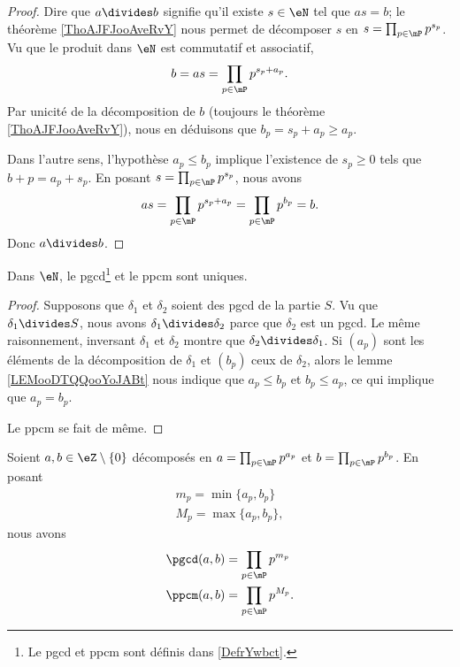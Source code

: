 \begin{proof}
    Dire que \( a\divides b\) signifie qu'il existe \( s\in \eN\) tel que \( as=b\); le théorème \ref{ThoAJFJooAveRvY} nous permet de décomposer \( s\) en \( s=\prod_{p\in\mP}p^{s_p}\). Vu que le produit dans \( \eN\) est commutatif et associatif,
    \begin{equation}
        b=as=\prod_{p\in\mP}p^{s_p+a_p}.
    \end{equation}
    Par unicité de la décomposition de \( b\) (toujours le théorème \ref{ThoAJFJooAveRvY}), nous en déduisons que \( b_p=s_p+a_p\geq a_p\).

    Dans l'autre sens, l'hypothèse \( a_p\leq b_p\) implique l'existence de \( s_p\geq 0\) tels que \( b+p=a_p+s_p\). En posant \( s=\prod_{p\in\mP}p^{s_p}\), nous avons
    \begin{equation}
        as=\prod_{p\in\mP}p^{s_p+a_p}=\prod_{p\in \mP}p^{b_p}=b.
    \end{equation}
    Donc \( a\divides b\).
\end{proof}

\begin{lemma}       \label{LEMooBJVJooFyuFeN}
    Dans \( \eN\), le pgcd\footnote{Le pgcd et ppcm sont définis dans \ref{DefrYwbct}.} et le ppcm sont uniques.
\end{lemma}

\begin{proof}
    Supposons que \( \delta_1\) et \( \delta_2\) soient des pgcd de la partie \( S\). Vu que \( \delta_1\divides S\), nous avons \( \delta_1\divides \delta_2\) parce que \( \delta_2\) est un pgcd. Le même raisonnement, inversant \( \delta_1\) et \( \delta_2\) montre que \( \delta_2\divides \delta_1\). Si \( (a_p)\) sont les éléments de la décomposition de \( \delta_1\) et \( (b_p)\) ceux de \( \delta_2\), alors le lemme \ref{LEMooDTQQooYoJABt} nous indique que \( a_p\leq b_p\) et \( b_p\leq a_p\), ce qui implique que \( a_p=b_p\).

    Le ppcm se fait de même.
\end{proof}

\begin{proposition}     \label{PROPooNQBOooHWqTvs}
    Soient \( a,b\in \eZ\setminus\{ 0 \}\) décomposés en \( a=\prod_{p\in\mP}p^{a_p}\) et \( b=\prod_{p\in\mP}p^{b_p}\). En posant 
    \begin{subequations}
        \begin{align}
            m_p=\min\{ a_p,b_p \}\\
            M_p=\max\{ a_p,b_p \},
        \end{align}
    \end{subequations}
    nous avons
    \begin{subequations}
        \begin{align}
            \pgcd(a,b)&=\prod_{p\in\mP}p^{m_p}\\
            \ppcm(a,b)&=\prod_{p\in\mP}p^{M_p}.
        \end{align}
    \end{subequations}
\end{proposition}

